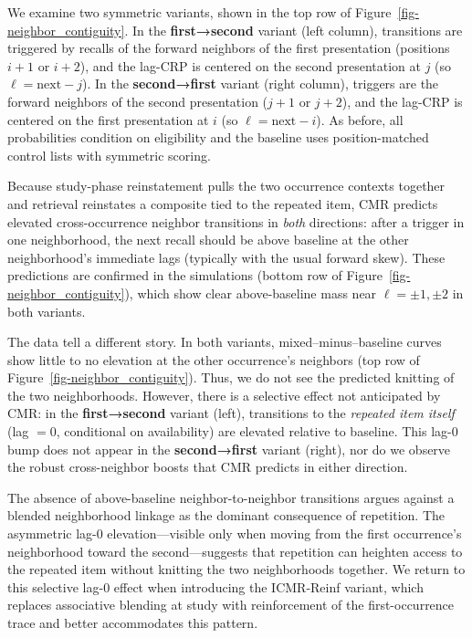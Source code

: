 \documentclass[
  letterpaper,
  11pt,
  english,
  singlespacing,
  headsepline]{MastersDoctoralThesis}
\begin{document}
We examine two symmetric variants, shown in the top row of
Figure~\ref{fig-neighbor_contiguity}. In the \textbf{first→second}
variant (left column), transitions are triggered by recalls of the
forward neighbors of the first presentation (positions \(i{+}1\) or
\(i{+}2\)), and the lag-CRP is centered on the second presentation at
\(j\) (so \(\ell=\text{next}-j\)). In the \textbf{second→first} variant
(right column), triggers are the forward neighbors of the second
presentation (\(j{+}1\) or \(j{+}2\)), and the lag-CRP is centered on
the first presentation at \(i\) (so \(\ell=\text{next}-i\)). As before,
all probabilities condition on eligibility and the baseline uses
position-matched control lists with symmetric scoring.

Because study-phase reinstatement pulls the two occurrence contexts
together and retrieval reinstates a composite tied to the repeated item,
CMR predicts elevated cross-occurrence neighbor transitions in
\emph{both} directions: after a trigger in one neighborhood, the next
recall should be above baseline at the other neighborhood's immediate
lags (typically with the usual forward skew). These predictions are
confirmed in the simulations (bottom row of
Figure~\ref{fig-neighbor_contiguity}), which show clear above-baseline
mass near \(\ell=\pm1,\pm2\) in both variants.

The data tell a different story. In both variants,
mixed--minus--baseline curves show little to no elevation at the other
occurrence's neighbors (top row of
Figure~\ref{fig-neighbor_contiguity}). Thus, we do not see the predicted
knitting of the two neighborhoods. However, there is a selective effect
not anticipated by CMR: in the \textbf{first→second} variant (left),
transitions to the \emph{repeated item itself} (lag \(=0\), conditional
on availability) are elevated relative to baseline. This lag-0 bump does
not appear in the \textbf{second→first} variant (right), nor do we
observe the robust cross-neighbor boosts that CMR predicts in either
direction.

The absence of above-baseline neighbor-to-neighbor transitions argues
against a blended neighborhood linkage as the dominant consequence of
repetition. The asymmetric lag-0 elevation---visible only when moving
from the first occurrence's neighborhood toward the second---suggests
that repetition can heighten access to the repeated item without
knitting the two neighborhoods together. We return to this selective
lag-0 effect when introducing the ICMR-Reinf variant, which replaces
associative blending at study with reinforcement of the first-occurrence
trace and better accommodates this pattern.
\end{document}
